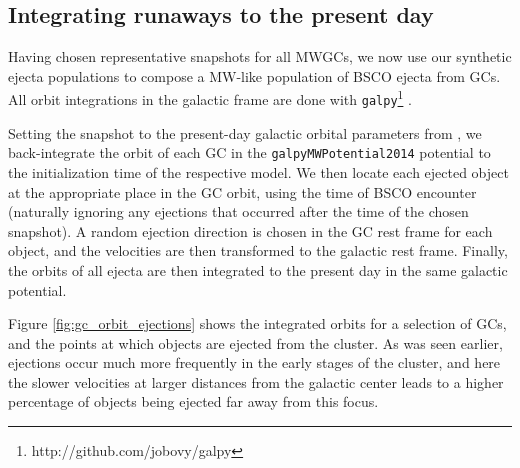 \documentclass[twocolumn]{aastex631}
\begin{document}
\subsection{Integrating runaways to the present day} \label{subsec:galpy}

Having chosen representative snapshots for all MWGCs, we now use our synthetic ejecta populations to compose a MW-like population of BSCO ejecta from GCs.
All orbit integrations in the galactic frame are done with \texttt{galpy}\footnote{http://github.com/jobovy/galpy} \citep{2015ApJS..216...29B}.

Setting the snapshot to the present-day galactic orbital parameters from \citet{2018MNRAS.478.1520B}, we back-integrate the orbit of each GC in the \texttt{galpy}\texttt{MWPotential2014} potential to the initialization time of the respective model.
We then locate each ejected object at the appropriate place in the GC orbit, using the time of BSCO encounter (naturally ignoring any ejections that occurred after the time of the chosen snapshot).
A random ejection direction is chosen in the GC rest frame for each object, and the velocities are then transformed to the galactic rest frame.
Finally, the orbits of all ejecta are then integrated to the present day in the same galactic potential.

Figure \ref{fig:gc_orbit_ejections} shows the integrated orbits for a selection of GCs, and the points at which objects are ejected from the cluster.
As was seen earlier, ejections occur much more frequently in the early stages of the cluster, and here the slower velocities at larger distances from the galactic center leads to a higher percentage of objects being ejected far away from this focus.

\begin{figure*}
    \caption{
        Plots showing the back-integrated orbits for some sample MWGCs (gray curves), and the points in the orbit where an object is ejected from the GC (scatter points).
        The color scale communicates the mass of the ejected star.
        The concentration of ejections in the first few orbits is clear, and an increased density of ejections when clusters are farther away from the galactic center is visible as well.
        Viewing the figure electronically makes it easier to find the few high-mass ejecta amid the abundance of lower mass objects.
    }
    \label{fig:gc_orbit_ejections}
\end{figure*}
\end{document}
